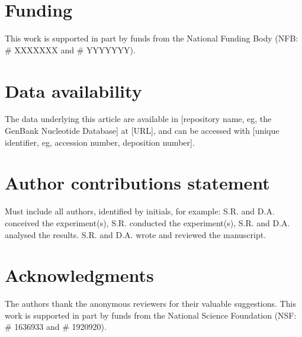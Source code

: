 \documentclass[unnumsec,webpdf,contemporary,large]{oup-authoring-template}%
\theoremstyle{thmstyleone}%
\theoremstyle{thmstyletwo}%
\theoremstyle{thmstylethree}%
\begin{document}
\section{Funding}
This work is supported in part by funds from the National Funding Body (NFB: \# XXXXXXX and \# YYYYYYY).

\section{Data availability}
The data underlying this article are available in [repository name, eg, the GenBank Nucleotide Database] at [URL], and can be accessed with [unique identifier, eg, accession number, deposition number].

\section{Author contributions statement}

Must include all authors, identified by initials, for example:
S.R. and D.A. conceived the experiment(s),  S.R. conducted the experiment(s), S.R. and D.A. analysed the results.  S.R. and D.A. wrote and reviewed the manuscript.

\section{Acknowledgments}
The authors thank the anonymous reviewers for their valuable suggestions. This work is supported in part by funds from the National Science Foundation (NSF: \# 1636933 and \# 1920920).
\end{document}
